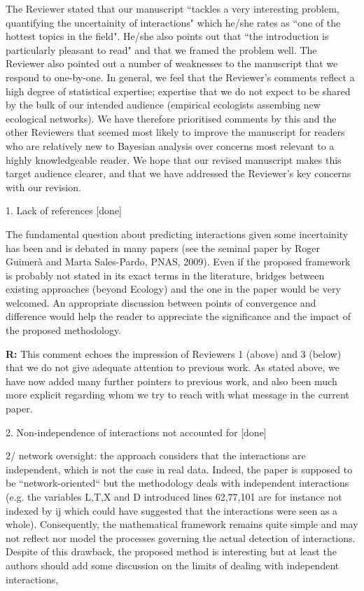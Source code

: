 \documentclass[12pt]{letter}
\newenvironment{refquote}{\bigskip \begin{it}}{\end{it}\smallskip}
\begin{document}
	The Reviewer stated that our manuscript ``tackles a very interesting problem, quantifying the uncertainity of interactions" which he/she rates as ``one of the hottest topics in the field". He/she also points out that ``the introduction is particularly pleasant to read" and that we framed the problem well. The Reviewer also pointed out a number of weaknesses to the manuscript that we respond to one-by-one. In general, we feel that the Reviewer's comments reflect a high degree of statistical expertise; expertise that we do not expect to be shared by the bulk of our intended audience (empirical ecologists assembing new ecological networks). We have therefore prioritised comments by this and the other Reviewers that seemed most likely to improve the manuscript for readers who are relatively new to Bayesian analysis over concerns most relevant to a highly knowledgeable reader. We hope that our revised manuscript makes this target audience clearer, and that we have addressed the Reviewer's key concerns with our revision.


	1. Lack of references [done]

		\begin{refquote}
			
			The fundamental question about predicting interactions given some incertainity has been and is debated in many papers (see the seminal paper by Roger Guimer\`{a} and Marta Sales-Pardo, PNAS, 2009). Even if the proposed framework is probably not stated in its exact terms in the literature, bridges between existing approaches (beyond Ecology) and the one in the paper would be very welcomed. An appropriate discussion between points of convergence and difference would help the reader to appreciate the significance and the impact of the proposed methodology.
		
		\end{refquote}


		\textbf{R:} This comment echoes the impression of Reviewers 1 (above) and 3 (below) that we do not give adequate attention to previous work. As stated above, we have now added many further pointers to previous work, and also been much more explicit regarding whom we try to reach with what message in the current paper.


	2. Non-independence of interactions not accounted for [done]

		\begin{refquote}
			2/ network oversight: the approach considers that the interactions are independent, which is not the case in real data. Indeed, the paper is supposed to be “network-oriented“ but the methodology deals with independent interactions (e.g. the variables L,T,X and D introduced lines 62,77,101 are for instance not indexed by ij which could have suggested that the interactions were seen as a whole). Consequently, the mathematical framework remains quite simple and may not reflect nor model the processes governing the actual detection of interactions. Despite of this drawback, the proposed method is interesting but at least the authors should add some discussion on the limits of dealing with independent interactions,
		\end{refquote}
\end{document}
